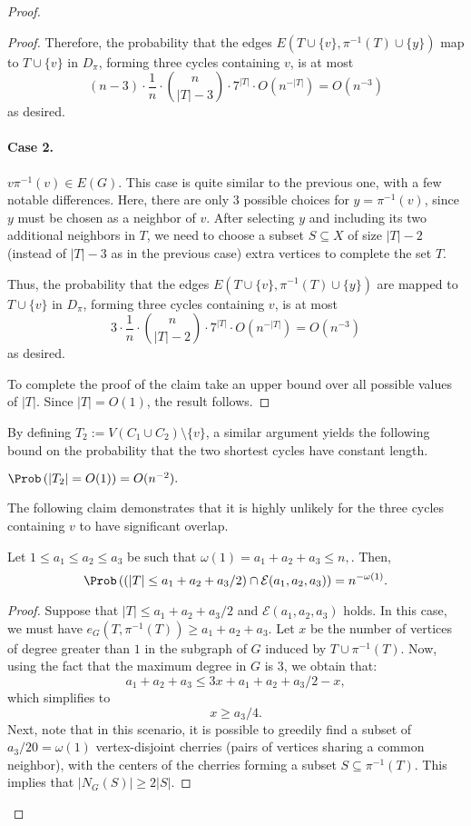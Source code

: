 \documentclass{article}
\begin{document}
\begin{proof}
\begin{proof}
Therefore, the probability that the edges $E(T\cup \{v\},\pi^{-1}(T)\cup\{y\})$ map to $T\cup \{v\}$ in $D_{\pi}$, forming three cycles containing $v$, is at most 
$$(n-3)\cdot \frac{1}{n}\cdot \binom{n}{|T|-3}\cdot 7^{|T|}\cdot O(n^{-|T|})=O(n^{-3})$$
as desired. 
\paragraph{\bf{Case 2.}}  $v\pi^{-1}(v)\in E(G)$. This case is quite similar to the previous one, with a few notable differences. Here, there are only $3$ possible choices for $y=\pi^{-1}(v)$, since  $y$ must be chosen as a neighbor of $v$. After selecting $y$ and including its two additional neighbors in $T$, we need to choose a subset $S\subseteq X$ of size $|T|-2$ (instead of $|T|-3$ as in the previous case) extra vertices to complete the set $T$. 


Thus, the probability that the edges $E(T\cup \{v\},\pi^{-1}(T)\cup\{y\})$ are mapped to $T\cup \{v\}$ in $D_{\pi}$, forming three cycles containing $v$, is at most 
$$3\cdot \frac{1}{n}\cdot \binom{n}{|T|-2}\cdot 7^{|T|}\cdot O(n^{-|T|})=O(n^{-3})$$
as desired. 

To complete the proof of the claim take an upper bound over all possible values of $|T|$. Since $|T|=O(1)$, the result follows.
\end{proof}

By defining $T_2:=V(C_1\cup C_2)\setminus\{v\}$, a similar argument yields the following bound on the probability that the two shortest cycles have constant length.

\begin{claim}\label{clm:big2}
    $\Prob\left(|T_2|=O(1)\right)=O(n^{-2}).$
\end{claim}

 
The following claim demonstrates that it is highly unlikely for the three cycles containing $v$ to have significant overlap.

\begin{claim} \label{large intersection}
Let $1\leq a_1\leq a_2\leq a_3$ be such that $\omega(1)=a_1+a_2+a_3\leq n,$. Then, 
    $$\Prob\left((|T|\leq a_1+a_2+a_3/2)\cap \mathcal E(a_1,a_2,a_3) \right)=n^{-\omega(1)}.$$
\end{claim}

\begin{proof}
Suppose that $|T|\leq a_1+a_2+a_3/2$ and $\mathcal E(a_1,a_2,a_3)$ holds. In this case, we must have $e_G(T,\pi^{-1}(T))\geq a_1+a_2+a_3.$ Let $x$ be the number of vertices of degree greater than $1$ in the subgraph of $G$ induced by $T\cup \pi^{-1}(T)$. Now, using the fact that the maximum degree in $G$ is $3$, we obtain that: 
$$a_1+a_2+a_3\leq 3x+a_1+a_2+a_3/2-x,$$
which simplifies to 
$$x\geq a_3/4.$$
Next, note that in this scenario, it is possible to greedily find a subset of $a_3/20=\omega(1)$ vertex-disjoint cherries (pairs of vertices sharing a common neighbor), with the centers of the cherries forming a subset $S\subseteq \pi^{-1}(T)$. This implies that $|N_G(S)|\geq 2|S|$.


\end{proof}
\end{proof}
\end{document}
